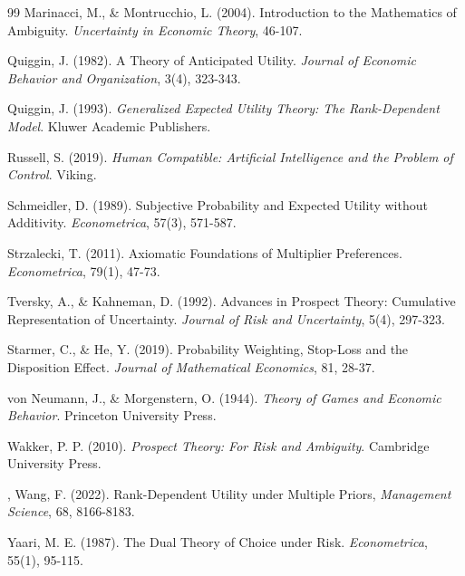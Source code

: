 \documentclass{article}
\theoremstyle{definition}
\begin{document}
\begin{thebibliography}{99}
 Marinacci, M., \& Montrucchio, L. (2004). Introduction to the Mathematics of Ambiguity. \textit{Uncertainty in Economic Theory}, 46-107.


 Quiggin, J. (1982). A Theory of Anticipated Utility. \textit{Journal of Economic Behavior and Organization}, 3(4), 323-343.

 Quiggin, J. (1993). \textit{Generalized Expected Utility Theory: The Rank-Dependent Model}. Kluwer Academic Publishers.

 Russell, S. (2019). \textit{Human Compatible: Artificial Intelligence and the Problem of Control}. Viking.



 Schmeidler, D. (1989). Subjective Probability and Expected Utility without Additivity. \textit{Econometrica}, 57(3), 571-587.

 Strzalecki, T. (2011). Axiomatic Foundations of Multiplier Preferences. \textit{Econometrica}, 79(1), 47-73.



 Tversky, A., \& Kahneman, D. (1992). Advances in Prospect Theory: Cumulative Representation of Uncertainty. \textit{Journal of Risk and Uncertainty}, 5(4), 297-323.

 Starmer, C., \& He, Y. (2019). Probability Weighting, Stop-Loss and the Disposition Effect. \textit{Journal of Mathematical Economics}, 81, 28-37.

 von Neumann, J., \& Morgenstern, O. (1944). \textit{Theory of Games and Economic Behavior}. Princeton University Press.

 Wakker, P. P. (2010). \textit{Prospect Theory: For Risk and Ambiguity}. Cambridge University Press.

, Wang, F. (2022). Rank-Dependent Utility under Multiple Priors, \textit{Management Science}, 68, 8166-8183.

 Yaari, M. E. (1987). The Dual Theory of Choice under Risk. \textit{Econometrica}, 55(1), 95-115.

\end{thebibliography}
\end{document}
